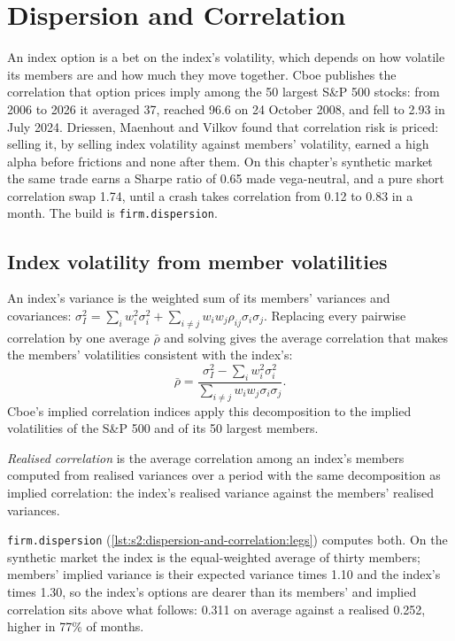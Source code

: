 \chapter{Dispersion and Correlation}\label{ch:s2:dispersion-and-correlation}

An index option is a bet on the index's volatility, which depends on how volatile its members are and how much they move together. Cboe publishes the
correlation that option prices imply among the 50 largest S\&P 500 stocks: from 2006 to 2026 it averaged 37, reached 96.6 on 24 October 2008, and fell
to 2.93 in July 2024. Driessen, Maenhout and Vilkov found that correlation risk is priced: selling it, by selling index volatility against members'
volatility, earned a high alpha before frictions and none after them. On this chapter's synthetic market the same trade earns a Sharpe ratio of 0.65
made vega-neutral, and a pure short correlation swap 1.74, until a crash takes correlation from 0.12 to 0.83 in a month. The build is
\texttt{firm.dispersion}.

\section{Index volatility from member volatilities}

An index's variance is the weighted sum of its members' variances and covariances: $\sigma_I^2 = \sum_i w_i^2\sigma_i^2 + \sum_{i \ne j} w_i w_j
\rho_{ij}\sigma_i\sigma_j$. Replacing every pairwise correlation by one average $\bar\rho$ and solving gives the average correlation that makes the
members' volatilities consistent with the index's:
\[
\bar\rho = \frac{\sigma_I^2 - \sum_i w_i^2\sigma_i^2}{\sum_{i \ne j} w_i w_j \sigma_i\sigma_j}.
\]
Cboe's implied correlation indices apply this decomposition to the implied volatilities of the S\&P 500 and of its 50 largest members.

\begin{definition}\label{def:s2:dispersion-and-correlation:realised}
\emph{Realised correlation} is the average correlation among an index's members computed from realised variances over a
period with the same decomposition as implied correlation: the index's realised variance against the members' realised variances.
\end{definition}

\texttt{firm.dispersion} (\cref{lst:s2:dispersion-and-correlation:legs}) computes both. On the synthetic market the index is the equal-weighted
average of thirty members; members' implied variance is their expected variance times 1.10 and the index's times 1.30, so the index's options are dearer
than its members' and implied correlation sits above what follows: 0.311 on average against a realised 0.252, higher in 77\% of months.

